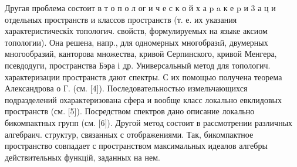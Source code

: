 \documentclass[10pt]{article}
\begin{document}
Другая проблема состоит в т о п о л ог и ч е с к о й х а p a к е p и 3 а ц и отдельных пространств и классов пространств (т. е. их указания характеристическіх топологич. свойств, формулируемых на языке аксиом топологии). Она решена, напр., для одномерных многобразıй, двумерных многообразий, канторова множества, кривой Серпинского, кривой Менгера, псевдодуги, пространства Бэра і др. Универсальный метод для топологич. характеризации пространств дают спектры. С их помощью получена теорема Александрова о Г. (см. [4]). Последовательностью измельчающихся подразделений охарактеризована сфера и вообще класс локально евклидовых пространств (см. [5]). Посредством спектров дано описание локально бикомпактных групп (см. [6]). Другой метод состоит в рассмотрении различных алгебраич. структур, связанных с отображениями. Так, бикомпактное пространство совпадает с пространством максимальных идеалов алгебры действительных функцій, заданных на нем.
\end{document}

